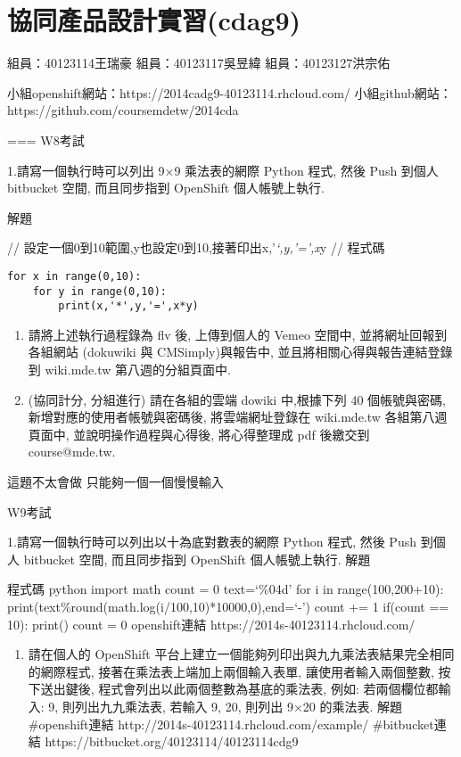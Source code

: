 \documentclass[]{article}
\begin{document}
\section{協同產品設計實習(cdag9)}\label{ux5354ux540cux7522ux54c1ux8a2dux8a08ux5be6ux7fd2cdag9}

組員：40123114王瑞豪 組員：40123117吳昱緯 組員：40123127洪宗佑

小組openshift網站：https://2014cadg9-40123114.rhcloud.com/
小組github網站：https://github.com/coursemdetw/2014cda

=== W8考試

1.請寫一個執行時可以列出 9×9 乘法表的網際 Python 程式, 然後 Push 到個人
bitbucket 空間, 而且同步指到 OpenShift 個人帳號上執行.

解題

// 設定一個0到10範圍,y也設定0到10,接著印出x,'\emph{`,y,'=',x}y // 程式碼

\begin{verbatim}
for x in range(0,10):
    for y in range(0,10):
        print(x,'*',y,'=',x*y)
\end{verbatim}

\begin{enumerate}
\def\labelenumi{\arabic{enumi}.}
\setcounter{enumi}{1}
\item
  請將上述執行過程錄為 flv 後, 上傳到個人的 Vemeo 空間中,
  並將網址回報到各組網站 (dokuwiki 與 CMSimply)與報告中,
  並且將相關心得與報告連結登錄到 wiki.mde.tw 第八週的分組頁面中.
\item
  (協同計分, 分組進行) 請在各組的雲端 dowiki 中,根據下列 40
  個帳號與密碼, 新增對應的使用者帳號與密碼後, 將雲端網址登錄在
  wiki.mde.tw 各組第八週頁面中, 並說明操作過程與心得後, 將心得整理成 pdf
  後繳交到 course@mde.tw.
\end{enumerate}

這題不太會做 只能夠一個一個慢慢輸入

W9考試

1.請寫一個執行時可以列出以十為底對數表的網際 Python 程式, 然後 Push
到個人 bitbucket 空間, 而且同步指到 OpenShift 個人帳號上執行. 解題

程式碼 python import math count = 0 text=`\%04d' for i in
range(100,200+10):
print(text\%round(math.log(i/100,10)*10000,0),end=`-') count += 1
if(count == 10): print() count = 0 openshift連結
https://2014s-40123114.rhcloud.com/

\begin{enumerate}
\def\labelenumi{\arabic{enumi}.}
\setcounter{enumi}{1}
\itemsep1pt\parskip0pt
\item
  請在個人的 OpenShift
  平台上建立一個能夠列印出與九九乘法表結果完全相同的網際程式,
  接著在乘法表上端加上兩個輸入表單, 讓使用者輸入兩個整數, 按下送出鍵後,
  程式會列出以此兩個整數為基底的乘法表, 例如: 若兩個欄位都輸入: 9,
  則列出九九乘法表, 若輸入 9, 20, 則列出 9×20 的乘法表. 解題
  \#openshift連結 http://2014s-40123114.rhcloud.com/example/
  \#bitbucket連結 https://bitbucket.org/40123114/40123114cdg9
\end{enumerate}
\end{document}
